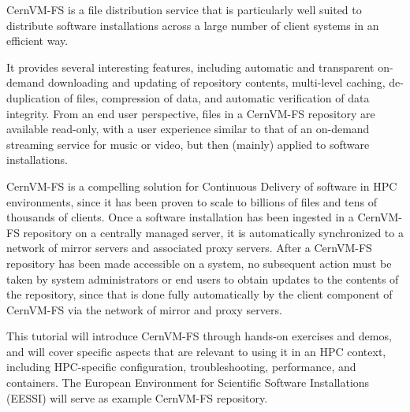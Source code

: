 CernVM-FS is a file distribution service that is particularly well suited to distribute software installations across a large number of client systems in an efficient way.

It provides several interesting features, including automatic and transparent on-demand downloading and updating of repository contents, multi-level caching, de-duplication of files, compression of data, and automatic verification of data integrity.
From an end user perspective, files in a CernVM-FS repository are available read-only, with a user experience similar to that of an on-demand streaming service for music or video, but then (mainly) applied to software installations.

CernVM-FS is a compelling solution for Continuous Delivery of software in HPC environments, since it has been proven to scale to billions of files and tens of thousands of clients. Once a software installation has been ingested in a CernVM-FS repository on a centrally managed server, it is
automatically synchronized to a network of mirror servers and associated proxy servers.
After a CernVM-FS repository has been made accessible on a system, no subsequent action must be taken by system administrators or end users to obtain updates to the contents of the repository, since that is done fully automatically by the client component of CernVM-FS via the network of mirror and proxy servers.

This tutorial will introduce CernVM-FS through hands-on exercises and demos, and will cover specific aspects that are relevant to using it in an HPC context, including HPC-specific configuration, troubleshooting, performance, and containers. The European Environment for Scientific Software
Installations (EESSI) will serve as example CernVM-FS repository.



